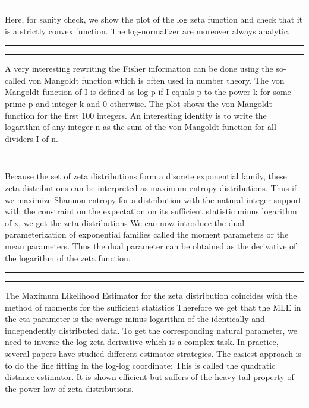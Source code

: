 \documentclass{article}
\def\slide#1{
\noindent\hrule
\begin{center}
\begin{minipage}{0.8\textwidth}
#1
\end{minipage}
\end{center}
\noindent\hrule
}
\begin{document}
\slide{Here, for sanity check, we show the plot of the log zeta function and check that it is a strictly convex function.
The log-normalizer are moreover always analytic.
}

















\slide{A very interesting rewriting the Fisher information can be done using the so-called von Mangoldt function which is often used in number theory.
The von Mangoldt function of I is defined as log p if I equals p to the power k for some prime p and integer k and 0 otherwise.
The plot shows the von Mangoldt function for the first 100 integers. 
An interesting identity is to write the logarithm of any integer n as the sum of the von Mangoldt function for all dividers I of n.
}







\slide{
Because the set of zeta distributions form a discrete exponential family, these zeta distributions can be interpreted as maximum entropy distributions.
Thus if we maximize Shannon entropy for a distribution with the natural integer support with the constraint on the expectation on its sufficient statistic minus logarithm of x, we get the zeta distributions
We can now introduce the dual parameterization of exponential families called the moment parameters or the mean parameters. Thus the dual parameter can be obtained as the derivative of the logarithm of the zeta function.
}









\slide{The Maximum Likelihood Estimator for the zeta distribution coincides with the method of moments for the sufficient statistics
Therefore we get that the MLE in the eta parameter is the average minus logarithm of the identically and independently distributed data.
To get the corresponding natural parameter, we need to inverse the log zeta derivative which is a complex task.
In practice, several papers have studied different estimator strategies.
The easiest approach is to do the line fitting in the log-log coordinate: This is called the quadratic distance estimator. It is shown efficient but suffers of the heavy tail property of the power law of zeta distributions.}
\end{document}
